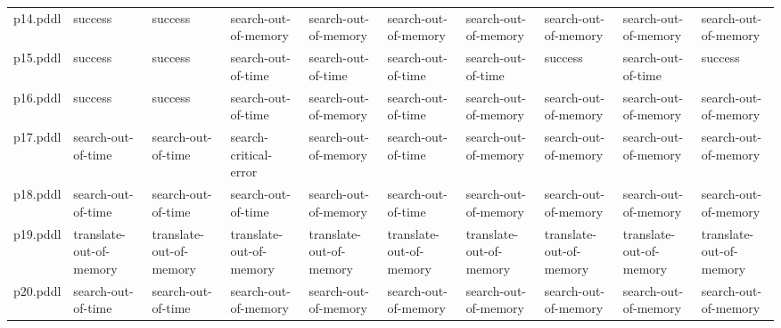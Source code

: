 \documentclass{article}
\begin{document}
\begin{tabular}{@{}lrrrrrrrrr@{}}
p14.pddl & \multicolumn{1}{|l|}{success} & \multicolumn{1}{|l|}{success} & \multicolumn{1}{|l|}{search-out-of-memory} & \multicolumn{1}{|l|}{search-out-of-memory} & \multicolumn{1}{|l|}{search-out-of-memory} & \multicolumn{1}{|l|}{search-out-of-memory} & \multicolumn{1}{|l|}{search-out-of-memory} & \multicolumn{1}{|l|}{search-out-of-memory} & \multicolumn{1}{|l|}{search-out-of-memory} \\
p15.pddl & \multicolumn{1}{|l|}{success} & \multicolumn{1}{|l|}{success} & \multicolumn{1}{|l|}{search-out-of-time} & \multicolumn{1}{|l|}{search-out-of-time} & \multicolumn{1}{|l|}{search-out-of-time} & \multicolumn{1}{|l|}{search-out-of-time} & \multicolumn{1}{|l|}{success} & \multicolumn{1}{|l|}{search-out-of-time} & \multicolumn{1}{|l|}{success} \\
p16.pddl & \multicolumn{1}{|l|}{success} & \multicolumn{1}{|l|}{success} & \multicolumn{1}{|l|}{search-out-of-time} & \multicolumn{1}{|l|}{search-out-of-memory} & \multicolumn{1}{|l|}{search-out-of-time} & \multicolumn{1}{|l|}{search-out-of-memory} & \multicolumn{1}{|l|}{search-out-of-memory} & \multicolumn{1}{|l|}{search-out-of-memory} & \multicolumn{1}{|l|}{search-out-of-memory} \\
p17.pddl & \multicolumn{1}{|l|}{search-out-of-time} & \multicolumn{1}{|l|}{search-out-of-time} & \multicolumn{1}{|l|}{search-critical-error} & \multicolumn{1}{|l|}{search-out-of-memory} & \multicolumn{1}{|l|}{search-out-of-time} & \multicolumn{1}{|l|}{search-out-of-memory} & \multicolumn{1}{|l|}{search-out-of-memory} & \multicolumn{1}{|l|}{search-out-of-memory} & \multicolumn{1}{|l|}{search-out-of-memory} \\
p18.pddl & \multicolumn{1}{|l|}{search-out-of-time} & \multicolumn{1}{|l|}{search-out-of-time} & \multicolumn{1}{|l|}{search-out-of-time} & \multicolumn{1}{|l|}{search-out-of-memory} & \multicolumn{1}{|l|}{search-out-of-time} & \multicolumn{1}{|l|}{search-out-of-memory} & \multicolumn{1}{|l|}{search-out-of-memory} & \multicolumn{1}{|l|}{search-out-of-memory} & \multicolumn{1}{|l|}{search-out-of-memory} \\
p19.pddl & \multicolumn{1}{|l|}{translate-out-of-memory} & \multicolumn{1}{|l|}{translate-out-of-memory} & \multicolumn{1}{|l|}{translate-out-of-memory} & \multicolumn{1}{|l|}{translate-out-of-memory} & \multicolumn{1}{|l|}{translate-out-of-memory} & \multicolumn{1}{|l|}{translate-out-of-memory} & \multicolumn{1}{|l|}{translate-out-of-memory} & \multicolumn{1}{|l|}{translate-out-of-memory} & \multicolumn{1}{|l|}{translate-out-of-memory} \\
p20.pddl & \multicolumn{1}{|l|}{search-out-of-time} & \multicolumn{1}{|l|}{search-out-of-time} & \multicolumn{1}{|l|}{search-out-of-memory} & \multicolumn{1}{|l|}{search-out-of-memory} & \multicolumn{1}{|l|}{search-out-of-memory} & \multicolumn{1}{|l|}{search-out-of-memory} & \multicolumn{1}{|l|}{search-out-of-memory} & \multicolumn{1}{|l|}{search-out-of-memory} & \multicolumn{1}{|l|}{search-out-of-memory} \\
\end{tabular}
\end{document}
